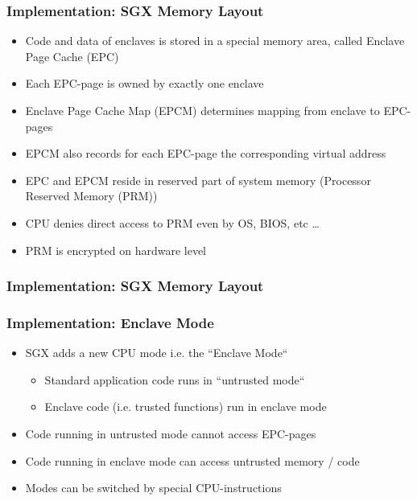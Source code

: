 \begin{frame}
    \frametitle{Implementation: SGX Memory Layout}
    \begin{itemize}[<+->]
        \item Code and data of enclaves is stored in a special memory area, called Enclave Page Cache (EPC)
        \item Each EPC-page is owned by exactly one enclave
        \item Enclave Page Cache Map (EPCM) determines mapping from enclave to EPC-pages
        \item EPCM also records for each EPC-page the corresponding virtual address
        \item EPC and EPCM reside in reserved part of system memory (Processor Reserved Memory (PRM))
        \item CPU denies direct access to PRM even by OS, BIOS, etc \dots
        \item PRM is encrypted on hardware level
    \end{itemize}
\end{frame}

\begin{frame}
    \frametitle{Implementation: SGX Memory Layout}
    \centering
\end{frame}

\begin{frame}
    \frametitle{Implementation: Enclave Mode}
    \begin{itemize}[<+->]
        \item SGX adds a new CPU mode i.e. the ``Enclave Mode``
        \begin{itemize}
            \item Standard application code runs in ``untrusted mode``
            \item Enclave code (i.e. trusted functions) run in enclave mode
        \end{itemize}
        \item Code running in untrusted mode cannot access EPC-pages
        \item Code running in enclave mode can access untrusted memory / code
        \item Modes can be switched by special CPU-instructions
    \end{itemize}
    $ $ \newline
    \centering
\end{frame}

